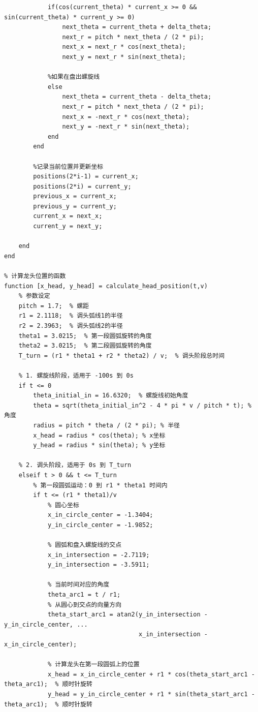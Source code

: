 \documentclass{cumcmthesis1}
\begin{document}
\begin{lstlisting}[caption={求解问题5的代码，将过程和结果打印到控制台上}, label={lst:tenth_code}]
            %如果在盘入螺旋线
            if(cos(current_theta) * current_x >= 0 && sin(current_theta) * current_y >= 0)
                next_theta = current_theta + delta_theta;
                next_r = pitch * next_theta / (2 * pi);
                next_x = next_r * cos(next_theta);
                next_y = next_r * sin(next_theta);

            %如果在盘出螺旋线
            else
                next_theta = current_theta - delta_theta;
                next_r = pitch * next_theta / (2 * pi);
                next_x = -next_r * cos(next_theta);
                next_y = -next_r * sin(next_theta);
            end
        end

        %记录当前位置并更新坐标
        positions(2*i-1) = current_x;
        positions(2*i) = current_y;
        previous_x = current_x;
        previous_y = current_y;
        current_x = next_x;
        current_y = next_y;

    end
end

% 计算龙头位置的函数
function [x_head, y_head] = calculate_head_position(t,v)
    % 参数设定
    pitch = 1.7;  % 螺距
    r1 = 2.1118;  % 调头弧线1的半径
    r2 = 2.3963;  % 调头弧线2的半径
    theta1 = 3.0215;  % 第一段圆弧旋转的角度
    theta2 = 3.0215;  % 第二段圆弧旋转的角度
    T_turn = (r1 * theta1 + r2 * theta2) / v;  % 调头阶段总时间
    
    % 1. 螺旋线阶段，适用于 -100s 到 0s
    if t <= 0
        theta_initial_in = 16.6320;  % 螺旋线初始角度
        theta = sqrt(theta_initial_in^2 - 4 * pi * v / pitch * t); % 角度
        radius = pitch * theta / (2 * pi); % 半径
        x_head = radius * cos(theta); % x坐标
        y_head = radius * sin(theta); % y坐标
    
    % 2. 调头阶段，适用于 0s 到 T_turn
    elseif t > 0 && t <= T_turn
        % 第一段圆弧运动：0 到 r1 * theta1 时间内
        if t <= (r1 * theta1)/v
            % 圆心坐标
            x_in_circle_center = -1.3404;
            y_in_circle_center = -1.9852;

            % 圆弧和盘入螺旋线的交点
            x_in_intersection = -2.7119;
            y_in_intersection = -3.5911;

            % 当前时间对应的角度
            theta_arc1 = t / r1;  
            % 从圆心到交点的向量方向
            theta_start_arc1 = atan2(y_in_intersection - y_in_circle_center, ...
                                     x_in_intersection - x_in_circle_center);
                                 
            % 计算龙头在第一段圆弧上的位置
            x_head = x_in_circle_center + r1 * cos(theta_start_arc1 - theta_arc1);  % 顺时针旋转
            y_head = y_in_circle_center + r1 * sin(theta_start_arc1 - theta_arc1);  % 顺时针旋转
            

\end{lstlisting}
\end{document}
